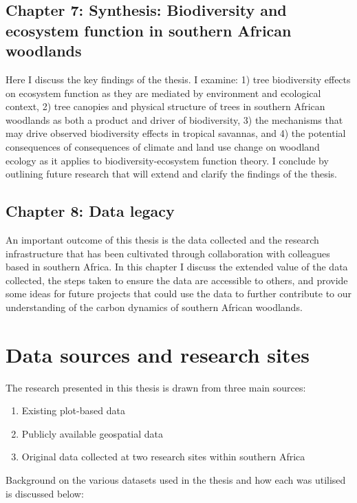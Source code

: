 \begin{refsection}
\subsection{Chapter 7: Synthesis: Biodiversity and ecosystem function in southern African woodlands}
\label{intro:ssec:chp7}

Here I discuss the key findings of the thesis. I examine: 1) tree biodiversity effects on ecosystem function as they are mediated by environment and ecological context, 2) tree canopies and physical structure of trees in southern African woodlands as both a product and driver of biodiversity, 3) the mechanisms that may drive observed biodiversity effects in tropical savannas, and 4) the potential consequences of consequences of climate and land use change on woodland ecology as it applies to biodiversity-ecosystem function theory. I conclude by outlining future research that will extend and clarify the findings of the thesis.

\subsection{Chapter 8: Data legacy}
\label{intro:ssec:chp8}

An important outcome of this thesis is the data collected and the research infrastructure that has been cultivated through collaboration with colleagues based in southern Africa. In this chapter I discuss the extended value of the data collected, the steps taken to ensure the data are accessible to others, and provide some ideas for future projects that could use the data to further contribute to our understanding of the carbon dynamics of southern African woodlands.

\section{Data sources and research sites}
\label{intro:sec:sources}

The research presented in this thesis is drawn from three main sources:

\begin{enumerate}
	\item{Existing plot-based data}
	\item{Publicly available geospatial data}
	\item{Original data collected at two research sites within southern Africa}
\end{enumerate}

Background on the various datasets used in the thesis and how each was utilised is discussed below:


\end{refsection}
